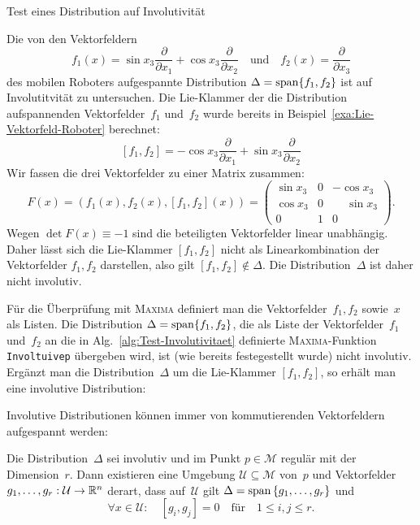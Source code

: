 \begin{algorithm}


\caption{Test eines Distribution auf Involutivität\label{alg:Test-Involutivitaet}}

\end{algorithm}

\begin{example}
\label{exa:Roboter-Test-Involutivitaet}Die von den Vektorfeldern
\[
f_{1}(x)=\sin x_{3}\frac{\partial}{\partial x_{1}}+\cos x_{3}\frac{\partial}{\partial x_{2}}\quad\mbox{und}\quad f_{2}(x)=\frac{\partial}{\partial x_{3}}
\]
des mobilen Roboters aufgespannte Distribution $\Delta={\operatorname{span}}\{f_{1},f_{2}\}$
ist auf Involutitvität zu untersuchen. Die Lie-Klammer der die Distribution
aufspannenden Vektorfelder~$f_{1}$ und~$f_{2}$ wurde bereits in
Beispiel~\ref{exa:Lie-Vektorfeld-Roboter} berechnet:
\[
[f_{1},f_{2}]=-\cos x_{3}\frac{\partial}{\partial x_{1}}+\sin x_{3}\frac{\partial}{\partial x_{2}}
\]
Wir fassen die drei Vektorfelder zu einer Matrix zusammen: 
\[
F(x)=\left(f_{1}(x),f_{2}(x),[f_{1},f_{2}](x)\right)=\left(\begin{array}{ccc}
\sin x_{3} & 0 & -\cos x_{3}\\
\cos x_{3} & 0 & \phantom{{-}}\sin x_{3}\\
0 & 1 & 0
\end{array}\right).
\]
Wegen $\det F(x)\equiv-1$ sind die beteiligten Vektorfelder linear
unabhängig. Daher lässt sich die Lie-Klammer $[f_{1},f_{2}]$ nicht
als Linearkombination der Vektorfelder $f_{1},f_{2}$ darstellen,
also gilt $[f_{1},f_{2}]\notin\Delta$. Die Distribution~$\Delta$
ist daher nicht involutiv.

Für die Überprüfung mit \textsc{Maxima} definiert man die Vektorfelder~$f_{1},f_{2}$
sowie~$x$ als Listen. Die Distribution $\Delta={\operatorname{span}}\{f_{1},f_{2}\}$,
die als Liste der Vektorfelder~$f_{1}$ und~$f_{2}$ an die in Alg.~\ref{alg:Test-Involutivitaet}
definierte \textsc{Maxima}-Funktion \texttt{Involtuivep} übergeben
wird, ist (wie bereits festegestellt wurde) nicht involutiv. Ergänzt
man die Distribution~$\Delta$ um die Lie-Klammer $[f_{1},f_{2}]$,
so erhält man eine involutive Distribution:

\begin{maxima}\end{maxima}
\end{example}

Involutive Distributionen können immer von kommutierenden Vektorfeldern
aufgespannt werden:
\begin{lemma}
\label{lem:Basisdarstellung-involutive-Distribution}Die Distribution~$\Delta$
sei involutiv und im Punkt $p\in\mathcal{M}$ regulär mit der Dimension~$r$.
Dann existieren eine Umgebung $\mathcal{U}\subseteq\mathcal{M}$ von~$p$
und Vektorfelder $g_{1},\ldots,g_{r}:\mathcal{U}\to{\mathbb{R}}^{n}$ derart,
dass auf~$\mathcal{U}$ gilt $\Delta={\operatorname{span}}\left\{ g_{1},\ldots,g_{r}\right\} $
und 
\[
\forall x\in\mathcal{U}:\quad[g_{i},g_{j}]=0\quad\mbox{für}\quad1\leq i,j\leq r.
\]
\end{lemma}


